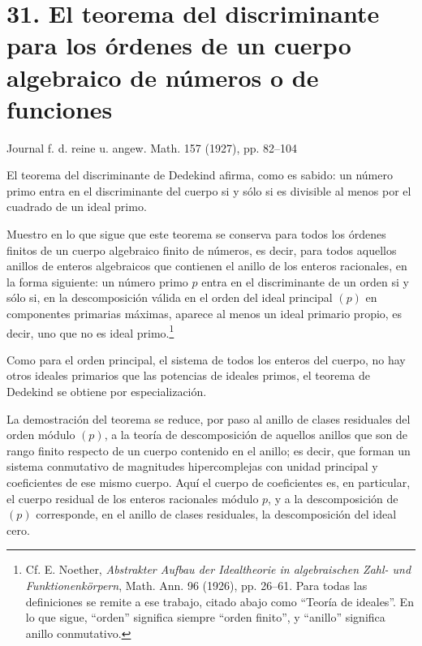 \documentclass[11pt]{article}
\begin{document}
\section*{31. El teorema del discriminante para los órdenes de un cuerpo algebraico de números o de funciones}
\begin{center}
Journal f. d. reine u. angew. Math. 157 (1927), pp. 82--104
\end{center}

El teorema del discriminante de Dedekind afirma, como es sabido: un número primo entra en el discriminante del cuerpo si y sólo si es divisible al menos por el cuadrado de un ideal primo.

Muestro en lo que sigue que este teorema se conserva para todos los órdenes finitos de un cuerpo algebraico finito de números, es decir, para todos aquellos anillos de enteros algebraicos que contienen el anillo de los enteros racionales, en la forma siguiente: un número primo $p$ entra en el discriminante de un orden si y sólo si, en la descomposición válida en el orden del ideal principal $(p)$ en componentes primarias máximas, aparece al menos un ideal primario propio, es decir, uno que no es ideal primo.\footnote{Cf. E. Noether, \emph{Abstrakter Aufbau der Idealtheorie in algebraischen Zahl- und Funktionenkörpern}, Math. Ann. 96 (1926), pp. 26--61. Para todas las definiciones se remite a ese trabajo, citado abajo como ``Teoría de ideales''. En lo que sigue, ``orden'' significa siempre ``orden finito'', y ``anillo'' significa anillo conmutativo.}

Como para el orden principal, el sistema de todos los enteros del cuerpo, no hay otros ideales primarios que las potencias de ideales primos, el teorema de Dedekind se obtiene por especialización.

La demostración del teorema se reduce, por paso al anillo de clases residuales del orden módulo $(p)$, a la teoría de descomposición de aquellos anillos que son de rango finito respecto de un cuerpo contenido en el anillo; es decir, que forman un sistema conmutativo de magnitudes hipercomplejas con unidad principal y coeficientes de ese mismo cuerpo. Aquí el cuerpo de coeficientes es, en particular, el cuerpo residual de los enteros racionales módulo $p$, y a la descomposición de $(p)$ corresponde, en el anillo de clases residuales, la descomposición del ideal cero.
\end{document}
